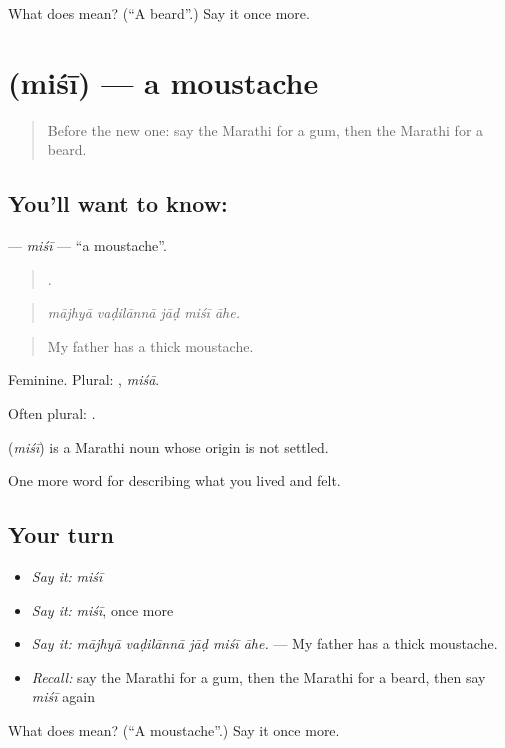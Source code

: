 \begin{tcolorbox}[breakable,colback=teal!4,colframe=teal!35!black,title={Before you move on}]
What does  mean? (\textquotedblleft{}A beard\textquotedblright{}.) Say it once more.
\end{tcolorbox}
\section[\texorpdfstring{\mr{मिशी} (miśī)}{मिशी (miśī)}]{ (miśī) — a moustache}

\label{lesson:MR-C476-misi}



\begin{quote}
Before the new one: say the Marathi for a gum, then the Marathi for a beard.
\end{quote}

\subsection*{You'll want to know: }
\textbf{} — \emph{miśī} — \textquotedblleft{}a moustache\textquotedblright{}.

\begin{quote}
    .
\end{quote}

\begin{quote}
\emph{mājhyā vaḍilānnā jāḍ miśī āhe.}
\end{quote}

\begin{quote}
My father has a thick moustache.
\end{quote}

Feminine. Plural: , \emph{miśā}.

Often plural: .

\begin{cousinweb}
\textbf{} (\emph{miśī}) is a Marathi noun whose origin is not settled.
\end{cousinweb}

\begin{grammarlens}[title={What you've built}]
One more word for describing what you lived and felt.
\end{grammarlens}

\subsection*{Your turn}
\begin{itemize}
\raggedright
  \item \emph{Say it:} \emph{miśī}
  \item \emph{Say it:} \emph{miśī}, once more
  \item \emph{Say it:} \emph{mājhyā vaḍilānnā jāḍ miśī āhe.} — My father has a thick moustache.
  \item \emph{Recall:} say the Marathi for a gum, then the Marathi for a beard, then say \emph{miśī} again
\end{itemize}

\begin{tcolorbox}[breakable,colback=teal!4,colframe=teal!35!black,title={Before you move on}]
What does  mean? (\textquotedblleft{}A moustache\textquotedblright{}.) Say it once more.
\end{tcolorbox}
